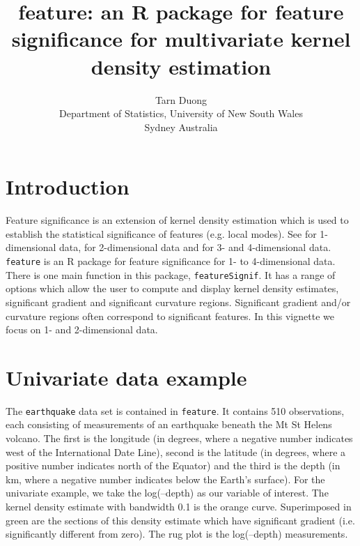 \documentclass[a4paper,11pt]{article}
\title{feature: an R package for feature significance for multivariate
kernel density estimation}
\author{Tarn Duong \\ Department of Statistics, University of New South Wales \\ Sydney Australia}
\begin{document}
\maketitle

\section{Introduction}

Feature significance is an extension of kernel density estimation
which is used to establish the statistical significance of 
features (e.g. local modes). See \citet*{chaudhuri99} for 1-dimensional data,
\citet*{godtliebsen02} for  2-dimensional data and \citet*{duong06}
for 3- and 4-dimensional data. \texttt{feature} is an R package for 
feature significance for 1- to 4-dimensional data.
  There is one main function in this package, \texttt{featureSignif}. 
It has a range of options which allow
the user to compute and display kernel density estimates, significant gradient
and significant curvature regions. Significant gradient and/or
curvature regions often correspond to significant features. 
In this vignette we focus on 1- and 2-dimensional data.


\section{Univariate data example}
The \texttt{earthquake} data set is contained in 
\texttt{feature}. It contains 510 observations, each consisting
of measurements of an earthquake beneath the Mt St Helens volcano.
The first is the longitude (in degrees, where a negative number
indicates west of the International Date Line), second  is
the latitude (in degrees, where a positive number indicates north of
the Equator) and the third  is the depth (in km, where a
negative number indicates below the Earth's surface).
For the univariate example, we take the log(--depth)
as our variable of interest. 
The kernel density estimate with bandwidth 0.1 is the orange curve. 
Superimposed in green 
are the sections of this density estimate which have significant gradient
(i.e. significantly different from zero). The rug plot is 
the log(--depth) measurements.
\end{document}
